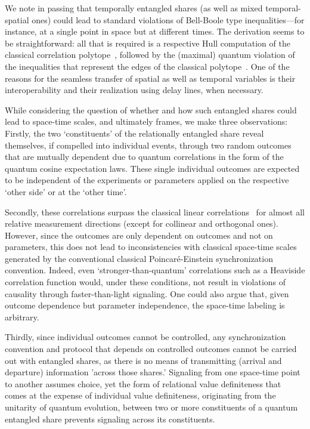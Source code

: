\documentclass[%
  reprint,
 showpacs,
 showkeys,
 preprintnumbers,
 nofootinbib,
 amsmath,amssymb,
 aps,
 pra,
  longbibliography,
 ]{revtex4-2}
\begin{document}
We note in passing that temporally entangled shares (as well as mixed temporal-spatial ones) could lead to standard
violations of Bell-Boole type inequalities---for instance, at a single point in space but at different times.
The derivation seems to be straightforward:
all that is required is a respective Hull computation
of the classical correlation polytope~\cite{froissart-81,pitowsky-86},
followed by the (maximal) quantum violation of the inequalities that represent the edges of
the classical polytope~\cite{cirelson:80,filipp-svo-04-qpoly-prl}.
One of the reasons for the seamless transfer of spatial as well as temporal variables
is their interoperability and their realization using delay lines, when necessary.

While considering the question of whether and how such entangled shares could lead to space-time scales, and ultimately frames,
we make three observations:
Firstly, the two `constituents' of the relationally entangled share reveal themselves, if compelled
into individual events, through two random outcomes that are mutually dependent due to quantum correlations
in the form of the quantum cosine expectation laws.
These single individual outcomes are expected to be independent of the experiments or parameters
applied on the respective `other side' or at the `other time'.

Secondly, these correlations surpass the classical linear correlations~\cite{Peres222}
for almost all relative measurement directions (except for collinear and orthogonal ones).
However, since the outcomes are only dependent on outcomes and not on parameters, this does not lead to
inconsistencies with classical space-time scales generated by the conventional classical Poincar\'e-Einstein
synchronization convention. Indeed, even `stronger-than-quantum' correlations such as a Heaviside
correlation function would, under these conditions, not result in violations of causality through faster-than-light signaling.
One could also argue that, given outcome dependence but parameter independence,
the space-time labeling is arbitrary.

Thirdly, since individual outcomes cannot be controlled, any synchronization convention and protocol
that depends on controlled outcomes cannot be carried out with entangled shares,
as there is no means of transmitting (arrival and departure) information
'across those shares.'
Signaling from one space-time point to another assumes choice,
yet the form of relational value definiteness that comes at the expense of individual value definiteness,
originating from the unitarity of quantum evolution,
between two or more constituents of a quantum entangled share
prevents signaling across its constituents.
\end{document}
